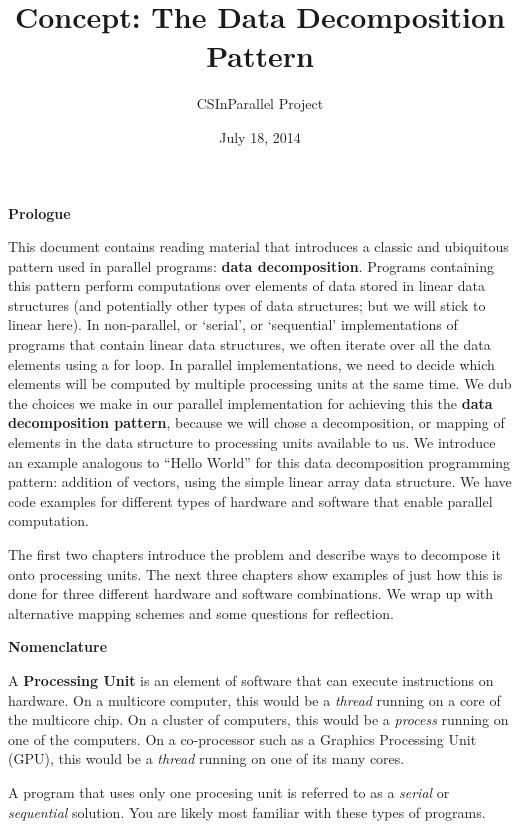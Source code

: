\documentclass[letterpaper,10pt,openany,oneside]{sphinxmanual}
\title{Concept: The Data Decomposition Pattern}
\date{July 18, 2014}
\author{CSInParallel Project}
\begin{document}
\maketitle
\tableofcontents
{}\label{index::doc}


\textbf{Prologue}

This document contains reading material that introduces a classic and ubiquitous
pattern used in parallel programs: \textbf{data decomposition}.
Programs containing this pattern perform computations over elements of data
stored in linear data structures (and potentially other types of data structures; but we will stick to linear here).  In non-parallel, or `serial', or `sequential' implementations of programs that contain linear data structures, we often iterate over all the data elements using a for loop. In parallel implementations, we need to decide which elements will be computed by multiple processing units at the same time. We dub the choices we make in our parallel implementation for achieving this the \textbf{data decomposition pattern}, because we will chose a decomposition, or mapping of elements in the data structure to processing units available to us.  We introduce an
example analogous to ``Hello World'' for this data decomposition programming pattern:
addition of vectors, using the simple linear array data structure.  We have code examples for different types of hardware and software that enable parallel computation.

The first two chapters introduce the problem and describe ways to decompose it onto processing units.  The next three chapters show examples of just how this is done for three different hardware and software combinations. We wrap up with alternative mapping schemes and some questions for reflection.

\textbf{Nomenclature}

A \textbf{Processing Unit} is an element of software that can execute instructions on hardware.  On a multicore computer, this would be a \emph{thread} running on a core of the multicore chip.  On a cluster of computers, this would be a \emph{process} running on one of the computers. On a co-processor such as a Graphics Processing Unit (GPU), this would be a \emph{thread} running on one of its many cores.

A program that uses only one procesing unit is referred to as a \emph{serial} or \emph{sequential} solution. You are likely most familiar with these types of programs.
\end{document}
